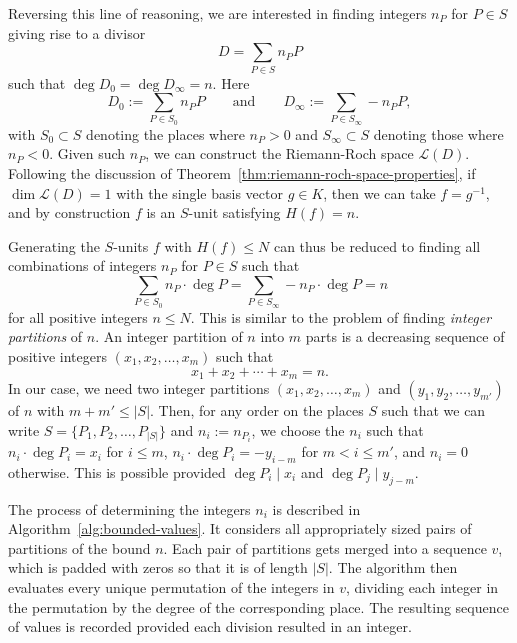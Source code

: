 Reversing this line of reasoning, we are interested in finding integers \(n_{P}\) for \(P \in S\) giving rise to a divisor
\[D = \sum_{P \in S} n_{P} P\]
such that \(\deg{D_{0}} = \deg{D_{\infty}} = n\). Here
\[D_{0} := \sum_{P \in S_{0}} n_{P} P \qquad \text{and} \qquad D_{\infty} := \sum_{P \in S_{\infty}} - n_{P} P,\]
with \(S_{0} \subset S\) denoting the places where \(n_{P} > 0\) and \(S_{\infty} \subset S\) denoting those where \(n_{P} < 0\). Given such \(n_{P}\), we can construct the Riemann-Roch space \(\mathcal{L}(D)\). Following the discussion of Theorem~\ref{thm:riemann-roch-space-properties}, if \(\dim{\mathcal{L}(D)} = 1\) with the single basis vector \(g \in K\), then we can take \(f = g^{-1}\), and by construction \(f\) is an \(S\)-unit satisfying \(H(f) = n\).

Generating the \(S\)-units \(f\) with \(H(f) \leq N\) can thus be reduced to finding all combinations of integers \(n_{P}\) for \(P \in S\) such that
\[\sum_{P \in S_{0}} n_{P} \cdot \deg{P} = \sum_{P \in S_{\infty}} - n_{P} \cdot \deg{P} = n\]
for all positive integers \(n \leq N\). This is similar to the problem of finding \textit{integer partitions} of \(n\). An integer partition of \(n\) into \(m\) parts is a decreasing sequence of positive integers \((x_{1}, x_{2}, \dots, x_{m})\) such that
\[x_{1} + x_{2} + \cdots + x_{m} = n.\]
In our case, we need two integer partitions \((x_{1}, x_{2}, \dots, x_{m})\) and \((y_{1}, y_{2}, \dots, y_{m'})\) of \(n\) with \({m + m' \leq |S|}\). Then, for any order on the places \(S\) such that we can write \(S = \{P_{1}, P_{2}, \dots, P_{|S|}\}\) and \(n_{i} := n_{P_{i}}\), we choose the \(n_{i}\) such that \(n_{i} \cdot \deg{P_{i}} = x_{i}\) for \(i \leq m\), \(n_{i} \cdot \deg{P_{i}} = -y_{i - m}\) for \(m < i \leq m'\), and \(n_{i} = 0\) otherwise. This is possible provided \(\deg{P_{i}} \mid x_{i}\) and \(\deg{P_{j}} \mid y_{j - m}\).

The process of determining the integers \(n_{i}\) is described in Algorithm~\ref{alg:bounded-values}. It considers all appropriately sized pairs of partitions of the bound \(n\). Each pair of partitions gets merged into a sequence \(v\), which is padded with zeros so that it is of length \(|S|\). The algorithm then evaluates every unique permutation of the integers in \(v\), dividing each integer in the permutation by the degree of the corresponding place. The resulting sequence of values is recorded provided each division resulted in an integer.

